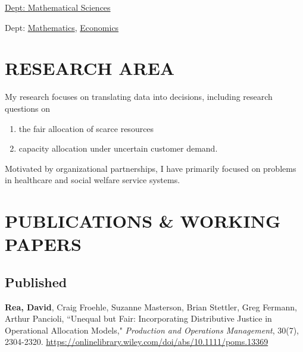 \documentclass[12pt, letter]{moderncv}
\begin{document}
{\hspace*{.35in}\href{https://www.clemson.edu/science/departments/math-stat/}{ Dept: Mathematical Sciences}}{}{}


{\hspace*{.35in} Dept: \href{https://www.wittenberg.edu/academics/math}{Mathematics}, \href{https://www.wittenberg.edu/academics/economics}{Economics}}{}{}{}

\smallskip
\section{RESEARCH AREA}
\smallskip
My research focuses on translating data into decisions, including research questions on
\smallskip 
\begin{enumerate}[\hspace{0.5cm}(1)]
	\item the fair allocation of scarce resources
	\item capacity allocation under uncertain customer demand.
\end{enumerate}
Motivated by organizational partnerships, I have primarily focused on problems in healthcare and social welfare service systems.
\smallskip
\section{PUBLICATIONS \& WORKING PAPERS}
\smallskip
\subsection{Published}
\smallskip
\textbf{Rea, David}, Craig Froehle, Suzanne Masterson, Brian Stettler, Greg Fermann, Arthur Pancioli, ``Unequal but Fair: Incorporating Distributive Justice in Operational Allocation Models," \textit{ Production and Operations Management}, 30(7), 2304-2320.  \newline \url{https://onlinelibrary.wiley.com/doi/abs/10.1111/poms.13369}\\
\end{document}
